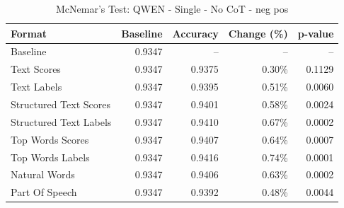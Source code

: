 \begin{table}[htbp]
\centering
\caption{McNemar's Test: QWEN - Single - No CoT - neg pos}
\label{tab:qwen-single-no_chain_of_thought-neg_pos}
\begin{tabular}{lrrrr}
\toprule
Format & Baseline & Accuracy & Change (\%) & p-value \\
\midrule
Baseline & 0.9347 & -- & -- & -- \\
Text Scores & 0.9347 & 0.9375 & 0.30\% & 0.1129 \\
Text Labels & 0.9347 & 0.9395 & 0.51\% & 0.0060 \\
Structured Text Scores & 0.9347 & 0.9401 & 0.58\% & 0.0024 \\
Structured Text Labels & 0.9347 & 0.9410 & 0.67\% & 0.0002 \\
Top Words Scores & 0.9347 & 0.9407 & 0.64\% & 0.0007 \\
Top Words Labels & 0.9347 & 0.9416 & 0.74\% & 0.0001 \\
Natural Words & 0.9347 & 0.9406 & 0.63\% & 0.0002 \\
Part Of Speech & 0.9347 & 0.9392 & 0.48\% & 0.0044 \\
\bottomrule
\end{tabular}
\end{table}